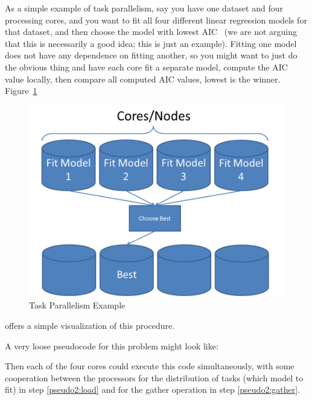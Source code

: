 As a simple example of task parallelism, say you have one dataset and four processing cores, and you want to fit all four different linear regression models for that dataset, and then choose the model with lowest AIC~\citep{aic} (we are not arguing that this is necessarily a good idea; this is just an example).  Fitting one model does not have any dependence on fitting another, so you might want to just do the obvious thing and have each core fit a separate model, compute the AIC value locally, then compare all computed AIC values, lowest is the winner. Figure~\ref{fig:taskparallel} 
\begin{figure}[h]
 \centering
 \includegraphics[scale=.45]{pbdDEMO-include/pics/parallelism_task}
 \caption{Task Parallelism Example}
 \label{fig:taskparallel}
\end{figure}
offers a simple visualization of this procedure.


A very loose pseudocode for this problem might look like:


Then each of the four cores could execute this code simultaneously, with some cooperation between the processors for the distribution of tasks (which model to fit) in step \ref{pseudo2:load} and for the gather operation in step \ref{pseudo2:gather}.


